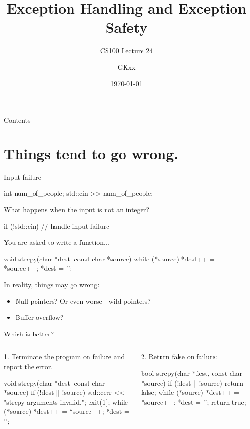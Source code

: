 \documentclass[aspectratio=169]{beamer}
\title{Exception Handling and Exception Safety}
\subtitle{CS100 Lecture 24}
\author{GKxx}
\date{\today}
\begin{document}
\begin{frame}
  \maketitle
\end{frame}

\begin{frame}{Contents}
  \tableofcontents
\end{frame}

\section{Things tend to go wrong.}

\begin{frame}[fragile]{Input failure}
  \begin{cpp}[\small]
  int num_of_people;
  std::cin >> num_of_people;
  \end{cpp}
  What happens when the input is not an integer?
  \pause
  \begin{cpp}[\small]
  if (!std::cin) {
    // handle input failure
  }
  \end{cpp}
\end{frame}

\begin{frame}[fragile]{}
  You are asked to write a  function...
  \begin{cpp}[\small]
void strcpy(char *dest, const char *source) {
  while (*source)
    *dest++ = *source++;
  *dest = '\0';
}
  \end{cpp}
  \pause
  In reality, things may go wrong:
  \begin{itemize}
    \item Null pointers? Or even worse - wild pointers?
    \item Buffer overflow?
  \end{itemize}
\end{frame}

\begin{frame}[fragile]{Which is better?}
  \begin{columns}
    \begin{column}{0.5\textwidth}
      1. Terminate the program on failure and report the error.
      \begin{cpp}
void strcpy(char *dest, const char *source) {
  if (!dest || !source) {
    std::cerr << "strcpy arguments invalid.\n";
    exit(1);
  }
  while (*source)
    *dest++ = *source++;
  *dest = '\0';
}
      \end{cpp}
    \end{column}
    \begin{column}{0.5\textwidth}
      2. Return false on failure:
      \begin{cpp}
bool strcpy(char *dest, const char *source) {
  if (!dest || !source)
    return false;
  while (*source)
    *dest++ = *source++;
  *dest = '\0';
  return true;
}
      \end{cpp}
    \end{column}
  \end{columns}
\end{frame}
\end{document}
